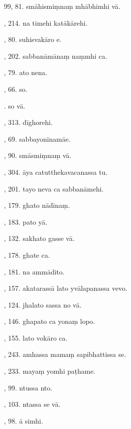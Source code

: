 99, 81. smāhismiṃnaṃ mhābhimhi vā.\hfill \pageref{sut:99}\par {}, 214. na timehi katākārehi.\hfill \pageref{sut:100}\par {}, 80. suhisvakāro e.\hfill \pageref{sut:101}\par {}, 202. sabbanāmānaṃ naṃmhi ca.\hfill \pageref{sut:102}\par {}, 79. ato nena.\hfill \pageref{sut:103}\par {}, 66. so.\hfill \pageref{sut:104}\par {}. so vā.\hfill \pageref{sut:105}\par {}, 313. dīghorehi.\hfill \pageref{sut:106}\par {}, 69. sabbayonīnamāe.\hfill \pageref{sut:107}\par {}, 90. smāsmiṃnaṃ vā.\hfill \pageref{sut:108}\par {}, 304. āya catutthekavacanassa tu.\hfill \pageref{sut:109}\par {}, 201. tayo neva ca sabbanāmehi.\hfill \pageref{sut:110}\par {}, 179. ghato nādīnaṃ.\hfill \pageref{sut:111}\par {}, 183. pato yā.\hfill \pageref{sut:112}\par {}, 132. sakhato gasse vā.\hfill \pageref{sut:113}\par {}, 178. ghate ca.\hfill \pageref{sut:114}\par {}, 181. na ammādito.\hfill \pageref{sut:115}\par {}, 157. akatarassā lato yvālapanassa vevo.\hfill \pageref{sut:116}\par {}, 124. jhalato sassa no vā.\hfill \pageref{sut:117}\par {}, 146. ghapato ca yonaṃ lopo.\hfill \pageref{sut:118}\par {}, 155. lato vokāro ca.\hfill \pageref{sut:119}\par {}, 243. amhassa mamaṃ sapibhattissa se.\par {}, 233. mayaṃ yomhi paṭhame.\par {}, 99. ntussa nto.\par {}, 103. ntassa se vā.\par {}, 98. ā simhi.\par \noindent
